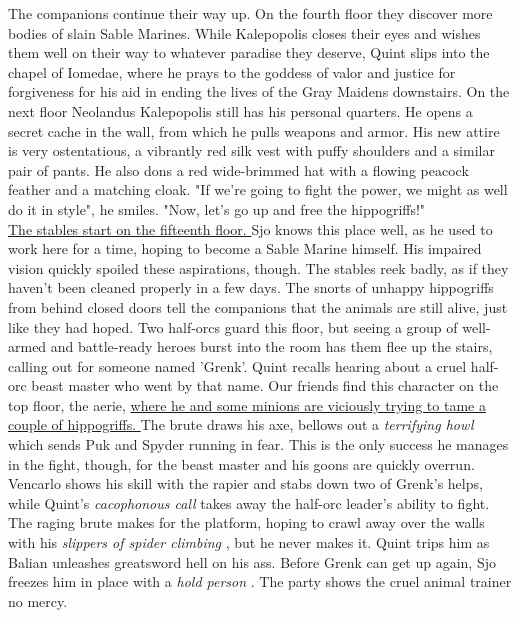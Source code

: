 The companions continue their way up. On the fourth floor they discover more bodies of slain Sable Marines. While Kalepopolis closes their eyes and wishes them well on their way to whatever paradise they deserve, Quint slips into the chapel of Iomedae, where he prays to the goddess of valor and justice for forgiveness for his aid in ending the lives of the Gray Maidens downstairs. On the next floor Neolandus Kalepopolis still has his personal quarters. He opens a secret cache in the wall, from which he pulls weapons and armor. His new attire is very ostentatious, a vibrantly red silk vest with puffy shoulders and a similar pair of pants. He also dons a red wide-brimmed hat with a flowing peacock feather and a matching cloak. "If we're going to fight the power, we might as well do it in style", he smiles. "Now, let's go up and free the hippogriffs!"\\

\hyperref[fig:Great-Tower-stables-in-Korvosa-567993978]{ The stables start on the fifteenth floor. } Sjo knows this place well, as he used to work here for a time, hoping to become a Sable Marine himself. His impaired vision quickly spoiled these aspirations, though. The stables reek badly, as if they haven't been cleaned properly in a few days. The snorts of unhappy hippogriffs from behind closed doors tell the companions that the animals are still alive, just like they had hoped. Two half-orcs guard this floor, but seeing a group of well-armed and battle-ready heroes burst into the room has them flee up the stairs, calling out for someone named 'Grenk'. Quint recalls hearing about a cruel half-orc beast master who went by that name. Our friends find this character on the top floor, the aerie, \hyperref[fig:Korvosa-Great-Tower-Aerie-567995366]{ where he and some minions are viciously trying to tame a couple of hippogriffs. } The brute draws his axe, bellows out a  {\itshape terrifying howl} which sends Puk and Spyder running in fear. This is the only success he manages in the fight, though, for the beast master and his goons are quickly overrun. Vencarlo shows his skill with the rapier and stabs down two of Grenk's helps, while Quint's  {\itshape cacophonous call} takes away the half-orc leader's ability to fight. The raging brute makes for the platform, hoping to crawl away over the walls with his  {\itshape slippers of spider climbing} , but he never makes it. Quint trips him as Balian unleashes greatsword hell on his ass. Before Grenk can get up again, Sjo freezes him in place with a  {\itshape hold person} . The party shows the cruel animal trainer no mercy. \\

